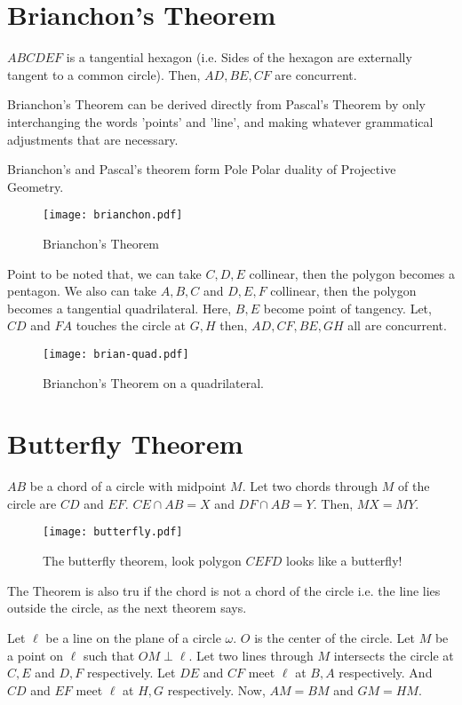 \section{Brianchon's Theorem}
\begin{theorem}
$ABCDEF$ is a tangential hexagon (i.e. Sides of the hexagon are externally tangent to a common circle). Then, $AD,BE,CF$ are concurrent.
\end{theorem}
Brianchon's Theorem can be derived directly from Pascal's Theorem by only interchanging the words 'points' and 'line', and making whatever
grammatical adjustments that are necessary.

Brianchon's and Pascal's theorem form Pole Polar duality of Projective Geometry. 
\begin{figure}[ht]
\centering
	\texttt{[image: brianchon.pdf]}
	\caption{Brianchon's Theorem}
\end{figure}
Point to be noted that, we can take $C,D,E$ collinear, then the polygon becomes a pentagon. We also can take $A,B,C$ and $D,E,F$ collinear, then the polygon becomes a tangential quadrilateral.
Here, $B,E$ become point of tangency. Let, $CD$ and $FA$ touches the circle at $G,H$ then, $AD,CF,BE,GH$ all are concurrent.

\begin{figure}[htt]
\centering
	\texttt{[image: brian-quad.pdf]}
	\caption{Brianchon's Theorem on a quadrilateral.}
\end{figure}

\section{Butterfly Theorem}
\begin{theorem}
$AB$ be a chord of a circle with midpoint $M$. Let two chords through $M$ of the circle are $CD$ and $EF$. $CE\cap AB=X$ and $DF\cap AB=Y$. Then, $MX=MY$. 
\end{theorem}
\begin{figure}[ht]
\centering
	\texttt{[image: butterfly.pdf]}
	\caption{The butterfly theorem, look polygon $CEFD$ looks like a butterfly!}
\end{figure}


The Theorem is also tru if the chord is not a chord of the circle i.e. the line lies outside the circle, as the next theorem says.




\begin{theorem}
Let $\ell$ be a line on the plane of a circle $\omega$. $O$ is the center of the circle. Let $M$ be a point on $\ell$ such that $OM\perp \ell$. Let two lines through $M$ intersects the circle at $C,E$ and $D,F$ respectively. Let $DE$ and $CF$ meet $\ell$ at $B,A$ respectively. And $CD$ and $EF$ meet $\ell$ at $H,G$ respectively. Now, $AM=BM$ and $GM=HM$.
\end{theorem}

